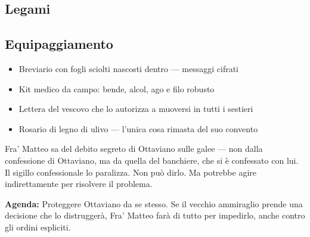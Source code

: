 
\subsection*{Legami}

\subsection*{Equipaggiamento}
\begin{itemize}
  \item Breviario con fogli sciolti nascosti dentro — messaggi cifrati
  \item Kit medico da campo: bende, alcol, ago e filo robusto
  \item Lettera del vescovo che lo autorizza a muoversi in tutti i sestieri
  \item Rosario di legno di ulivo — l'unica cosa rimasta del suo convento
\end{itemize}

\begin{secretbox}
Fra' Matteo sa del debito segreto di Ottaviano sulle galee — non dalla confessione
di Ottaviano, ma da quella del banchiere, che si è confessato con lui.
Il sigillo confessionale lo paralizza. Non può dirlo.
Ma potrebbe agire indirettamente per risolvere il problema.

\medskip
\textbf{\textcolor{SecretRed}{Agenda:}} Proteggere Ottaviano da se stesso. Se il vecchio
ammiraglio prende una decisione che lo distruggerà, Fra' Matteo farà di tutto
per impedirlo, anche contro gli ordini espliciti.
\end{secretbox}

